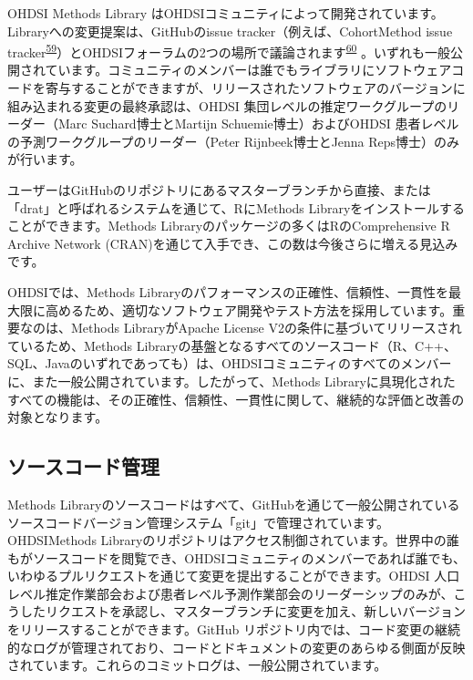 \documentclass[
  11pt]{book}
\theoremstyle{definition}
\theoremstyle{definition}
\theoremstyle{definition}
\theoremstyle{definition}
\theoremstyle{remark}
\begin{document}
OHDSI Methods Library はOHDSIコミュニティによって開発されています。Libraryへの変更提案は、GitHubのissue tracker（例えば、CohortMethod issue tracker\textsuperscript{\href{https://ohdsi.github.io/TheBookOfOhdsi/SoftwareValidity.html\#fn59}{59}}）とOHDSIフォーラムの2つの場所で議論されます\textsuperscript{\href{https://ohdsi.github.io/TheBookOfOhdsi/SoftwareValidity.html\#fn60}{60}} 。いずれも一般公開されています。コミュニティのメンバーは誰でもライブラリにソフトウェアコードを寄与することができますが、リリースされたソフトウェアのバージョンに組み込まれる変更の最終承認は、OHDSI 集団レベルの推定ワークグループのリーダー（Marc Suchard博士とMartijn Schuemie博士）およびOHDSI 患者レベルの予測ワークグループのリーダー（Peter Rijnbeek博士とJenna Reps博士）のみが行います。

ユーザーはGitHubのリポジトリにあるマスターブランチから直接、または「drat」と呼ばれるシステムを通じて、RにMethods Libraryをインストールすることができます。Methods Libraryのパッケージの多くはRのComprehensive R Archive Network (CRAN)を通じて入手でき、この数は今後さらに増える見込みです。

OHDSIでは、Methods Libraryのパフォーマンスの正確性、信頼性、一貫性を最大限に高めるため、適切なソフトウェア開発やテスト方法を採用しています。重要なのは、Methods LibraryがApache License V2の条件に基づいてリリースされているため、Methods Libraryの基盤となるすべてのソースコード（R、C++、SQL、Javaのいずれであっても）は、OHDSIコミュニティのすべてのメンバーに、また一般公開されています。したがって、Methods Libraryに具現化されたすべての機能は、その正確性、信頼性、一貫性に関して、継続的な評価と改善の対象となります。

\subsection{ソースコード管理}\label{ux30bdux30fcux30b9ux30b3ux30fcux30c9ux7ba1ux7406}

Methods Libraryのソースコードはすべて、GitHubを通じて一般公開されているソースコードバージョン管理システム「git」で管理されています。OHDSIMethods Libraryのリポジトリはアクセス制御されています。世界中の誰もがソースコードを閲覧でき、OHDSIコミュニティのメンバーであれば誰でも、いわゆるプルリクエストを通じて変更を提出することができます。OHDSI 人口レベル推定作業部会および患者レベル予測作業部会のリーダーシップのみが、こうしたリクエストを承認し、マスターブランチに変更を加え、新しいバージョンをリリースすることができます。GitHub リポジトリ内では、コード変更の継続的なログが管理されており、コードとドキュメントの変更のあらゆる側面が反映されています。これらのコミットログは、一般公開されています。
\end{document}
